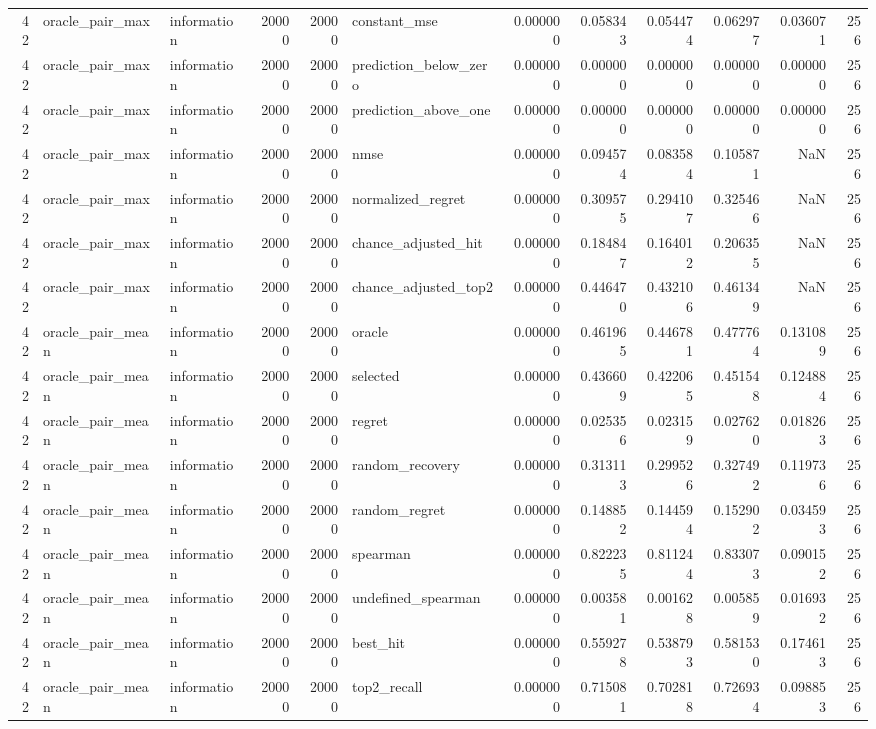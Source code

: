 \begin{tabular}{rllrrlrrrrrr}
42 & oracle_pair_max & information & 20000 & 20000 & constant_mse & 0.000000 & 0.058343 & 0.054474 & 0.062977 & 0.036071 & 256 \\
42 & oracle_pair_max & information & 20000 & 20000 & prediction_below_zero & 0.000000 & 0.000000 & 0.000000 & 0.000000 & 0.000000 & 256 \\
42 & oracle_pair_max & information & 20000 & 20000 & prediction_above_one & 0.000000 & 0.000000 & 0.000000 & 0.000000 & 0.000000 & 256 \\
42 & oracle_pair_max & information & 20000 & 20000 & nmse & 0.000000 & 0.094574 & 0.083584 & 0.105871 & NaN & 256 \\
42 & oracle_pair_max & information & 20000 & 20000 & normalized_regret & 0.000000 & 0.309575 & 0.294107 & 0.325466 & NaN & 256 \\
42 & oracle_pair_max & information & 20000 & 20000 & chance_adjusted_hit & 0.000000 & 0.184847 & 0.164012 & 0.206355 & NaN & 256 \\
42 & oracle_pair_max & information & 20000 & 20000 & chance_adjusted_top2 & 0.000000 & 0.446470 & 0.432106 & 0.461349 & NaN & 256 \\
42 & oracle_pair_mean & information & 20000 & 20000 & oracle & 0.000000 & 0.461965 & 0.446781 & 0.477764 & 0.131089 & 256 \\
42 & oracle_pair_mean & information & 20000 & 20000 & selected & 0.000000 & 0.436609 & 0.422065 & 0.451548 & 0.124884 & 256 \\
42 & oracle_pair_mean & information & 20000 & 20000 & regret & 0.000000 & 0.025356 & 0.023159 & 0.027620 & 0.018263 & 256 \\
42 & oracle_pair_mean & information & 20000 & 20000 & random_recovery & 0.000000 & 0.313113 & 0.299526 & 0.327492 & 0.119736 & 256 \\
42 & oracle_pair_mean & information & 20000 & 20000 & random_regret & 0.000000 & 0.148852 & 0.144594 & 0.152902 & 0.034593 & 256 \\
42 & oracle_pair_mean & information & 20000 & 20000 & spearman & 0.000000 & 0.822235 & 0.811244 & 0.833073 & 0.090152 & 256 \\
42 & oracle_pair_mean & information & 20000 & 20000 & undefined_spearman & 0.000000 & 0.003581 & 0.001628 & 0.005859 & 0.016932 & 256 \\
42 & oracle_pair_mean & information & 20000 & 20000 & best_hit & 0.000000 & 0.559278 & 0.538793 & 0.581530 & 0.174613 & 256 \\
42 & oracle_pair_mean & information & 20000 & 20000 & top2_recall & 0.000000 & 0.715081 & 0.702818 & 0.726934 & 0.098853 & 256 \\

\end{tabular}
